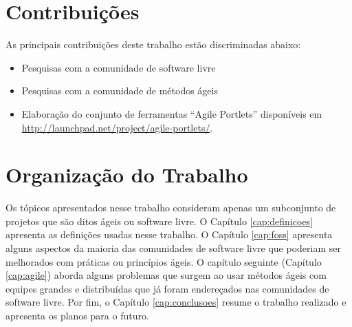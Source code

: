 \section{Contribuições}
\label{sec:contribucoes}

As principais contribuições deste trabalho estão discriminadas abaixo:

\begin{itemize}
\item Pesquisas com a comunidade de software livre
\item Pesquisas com a comunidade de métodos ágeis
\item Elaboração do conjunto de ferramentas ``Agile Portlets''
  disponíveis em \url{http://launchpad.net/project/agile-portlets/}.
\end{itemize}

\section{Organização do Trabalho}
\label{sec:organizacao_trabalho}

Os tópicos apresentados nesse trabalho consideram apenas um
subconjunto de projetos que são ditos ágeis ou software livre. O
Capítulo \ref{cap:definicoes} apresenta as definições usadas nesse
trabalho. O Capítulo \ref{cap:foss} apresenta alguns aspectos da
maioria das comunidades de software livre que poderiam ser melhorados
com práticas ou princípios ágeis. O capítulo seguinte (Capítulo
\ref{cap:agile}) aborda alguns problemas que surgem ao usar métodos
ágeis com equipes grandes e distribuídas que já foram endereçados nas
comunidades de software livre. Por fim, o Capítulo
\ref{cap:conclusoes} resume o trabalho realizado e apresenta os planos
para o futuro.
